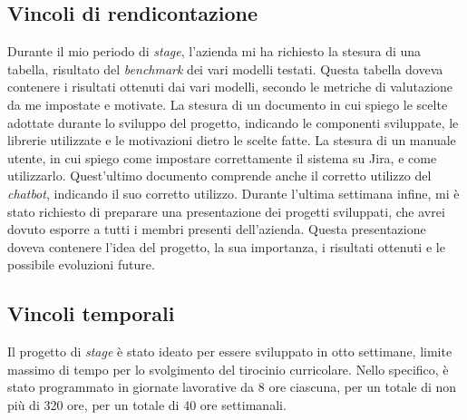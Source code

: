 \subsection{Vincoli di rendicontazione}
Durante il mio periodo di \textit{stage}, l'azienda mi ha richiesto la stesura di una tabella, risultato del \textit{benchmark} dei vari modelli testati. Questa tabella doveva contenere i risultati ottenuti dai vari modelli, secondo le metriche di valutazione da me impostate e motivate.
La stesura di un documento in cui spiego le scelte adottate durante lo sviluppo del progetto, indicando le componenti sviluppate, le librerie utilizzate e le motivazioni dietro le scelte fatte.
La stesura di un manuale utente, in cui spiego come impostare correttamente il sistema su Jira, e come utilizzarlo. Quest'ultimo documento comprende anche il corretto utilizzo del \textit{chatbot}, indicando il suo corretto utilizzo.
Durante l'ultima settimana infine, mi è stato richiesto di preparare una presentazione dei progetti sviluppati, che avrei dovuto esporre a tutti i membri presenti dell'azienda. Questa presentazione doveva contenere l'idea del progetto, la sua importanza, i risultati ottenuti e le possibile evoluzioni future.
\subsection{Vincoli temporali}
Il progetto di \textit{stage} è stato ideato per essere sviluppato in otto settimane, limite massimo di tempo per lo svolgimento del tirocinio curricolare. Nello specifico, è stato programmato in giornate lavorative da 8 ore ciascuna, per un totale di non più di 320 ore, per un totale di 40 ore settimanali.

